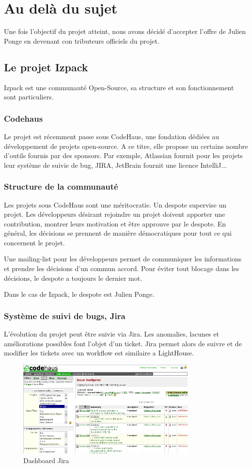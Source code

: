 \section{Au delà du sujet}
Une fois l'objectif du projet atteint, nous avons décidé d'accepter l'offre de Julien Ponge en devenant con tributeurs officiels du projet. 
\subsection{Le projet Izpack}
Izpack est une communauté Open-Source, sa structure et son fonctionnement sont particuliers.
\subsubsection{Codehaus}
Le projet est récemment passe sous CodeHaus, une fondation dédiées au développement de projets open-source. A ce titre, elle propose un certains nombre d'outils fournis par des sponsors. Par exemple, Atlassian fournit pour les projets leur système de suivie de bug, JIRA, JetBrain fournit une licence IntelliJ...
\subsubsection{Structure de la communauté}
Les projets sous CodeHaus sont une méritocratie. Un despote supervise un projet. Les développeurs désirant rejoindre un projet doivent apporter une contribution, montrer leurs motivation et être approuve par le despote. En général, les décisions se prennent de manière démocratiques pour tout ce qui concernent le projet.

Une mailing-list pour les développeurs permet de communiquer les informations et prendre les décisions d'un commun accord. Pour éviter tout blocage dans les décisions, le despote a toujours le dernier mot.

Dans le cas de Izpack, le despote est Julien Ponge.
\subsubsection{Système de suivi de bugs, Jira}
L'évolution du projet peut être suivie via Jira. Les anomalies, lacunes et améliorations possibles font l'objet d'un ticket. Jira permet alors de suivre et de modifier les tickets avec un workflow est similaire a LightHouse.
\begin{figure}[H]
	\centering
	\includegraphics[width=0.8\textwidth]{../image/jira.png}
	\caption{Dashboard Jira}
\end{figure}
